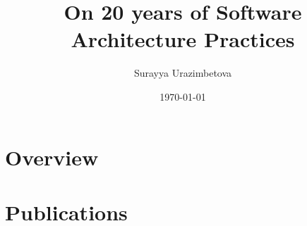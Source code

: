 \documentclass[11pt,a4paper,twoside,openright,oldfontcommands]{memoir}
\title{On 20 years of Software Architecture Practices}
\author{Surayya Urazimbetova}
\date{\today}
\begin{document}


\frontmatter


\cleardoublepage
\tableofcontents
\cleardoublepage

\mainmatter
{}


\part{Overview}
\label{part:overview}




\part{Publications}
\label{part:publications}



\backmatter



\cleardoublepage
 

\end{document}
